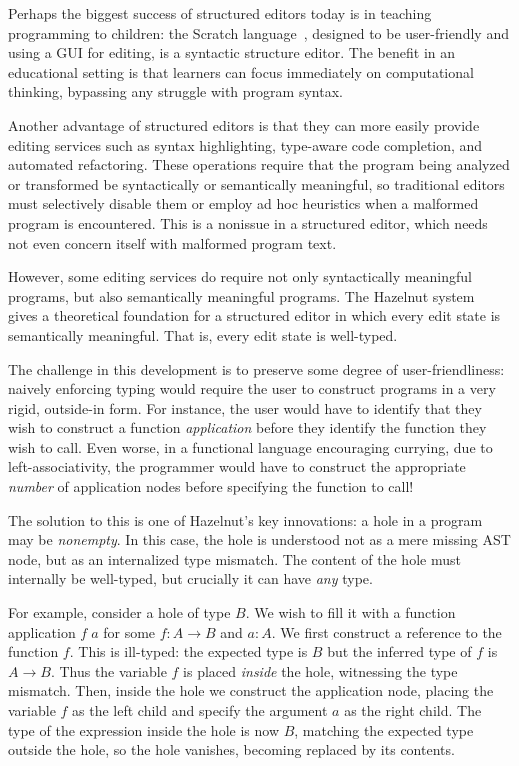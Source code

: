 Perhaps the biggest success of structured editors today is in teaching
programming to children: the Scratch language~\cite{scratch}, designed to be
user-friendly and using a GUI for editing, is a syntactic structure editor.
The benefit in an educational setting is that learners can focus immediately on
computational thinking, bypassing any struggle with program syntax.

Another advantage of structured editors is that they can more easily provide
editing services such as syntax highlighting, type-aware code completion, and
automated refactoring.
These operations require that the program being analyzed or transformed be
syntactically or semantically meaningful, so traditional editors must
selectively disable them or employ ad hoc heuristics when a malformed program is
encountered.
This is a nonissue in a structured editor, which needs not even concern itself
with malformed program text.

However, some editing services do require not only syntactically meaningful
programs, but also semantically meaningful programs.
The Hazelnut system~\cite{hazelnut} gives a theoretical foundation for a
structured editor in which every edit state is semantically meaningful.
That is, every edit state is well-typed.

The challenge in this development is to preserve some degree of
user-friendliness: naively enforcing typing would require the user to construct
programs in a very rigid, outside-in form.
For instance, the user would have to identify that they wish to construct a
function \emph{application} before they identify the function they wish to call.
Even worse, in a functional language encouraging currying, due to
left-associativity, the programmer would have to construct the appropriate
\emph{number} of application nodes before specifying the function to call!

The solution to this is one of Hazelnut's key innovations:
a hole in a program may be \emph{nonempty}.
In this case, the hole is understood not as a mere missing AST node, but as an
internalized type mismatch.
The content of the hole must internally be well-typed, but crucially it can have
\emph{any} type.

For example, consider a hole of type $B$. We wish to fill it with a function
application $f\;a$ for some $f : A \to B$ and $a : A$.
We first construct a reference to the function $f$.
This is ill-typed: the expected type is $B$ but the inferred type of $f$ is $A
\to B$.
Thus the variable $f$ is placed \emph{inside} the hole, witnessing the type
mismatch.
Then, inside the hole we construct the application node, placing the variable
$f$ as the left child and specify the argument $a$ as the right child.
The type of the expression inside the hole is now $B$, matching the expected
type outside the hole, so the hole vanishes, becoming replaced by its contents.

